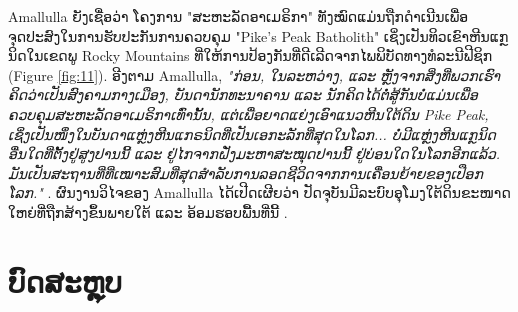 \documentclass[10pt,twocolumn,letterpaper]{article}
\begin{document}
Amallulla ຍັງເຊື່ອວ່າ ໂຄງການ "ສະຫະລັດອາເມຣິກາ" ທັງໝົດແມ່ນຖືກດໍາເນີນເພື່ອຈຸດປະສົງໃນການຮັບປະກັນການຄວບຄຸມ "Pike's Peak Batholith" ເຊິ່ງເປັນທິວເຂົາຫີນແກຼນິດໃນເຂດພູ Rocky Mountains ທີ່ໃຫ້ການປ້ອງກັນທີ່ດີເລີດຈາກໄພພິບັດທາງທໍລະນີຟີຊິກ (Figure \ref{fig:11}). \cite{166}
ອີງຕາມ Amallulla, \textit{"ກ່ອນ, ໃນລະຫວ່າງ, ແລະ ຫຼັງຈາກສິ່ງທີ່ພວກເຮົາຄິດວ່າເປັນສົງຄາມກາງເມືອງ, ບັນດານັກທະນາຄານ ແລະ ນັກຄິດໄດ້ຕໍ່ສູ້ກັນບໍ່ແມ່ນເພື່ອຄວບຄຸມສະຫະລັດອາເມຣິກາເທົ່ານັ້ນ, ແຕ່ເພື່ອຍາດແຍ່ງເອົາແນວຫີນໃຕ້ດິນ Pike Peak, ເຊິ່ງເປັນໜຶ່ງໃນບັນດາແຫຼ່ງຫີນແກຣນິດທີ່ເປັນເອກະລັກທີ່ສຸດໃນໂລກ... ບໍ່ມີແຫຼ່ງຫີນແກຼນິດອື່ນໃດທີ່ຕັ້ງຢູ່ສູງປານນີ້ ແລະ ຢູ່ໄກຈາກຝັ່ງມະຫາສະໝຸດປານນີ້ ຢູ່ບ່ອນໃດໃນໂລກອີກແລ້ວ. ມັນເປັນສະຖານທີ່ທີ່ເໝາະສົມທີ່ສຸດສຳລັບການລອດຊີວິດຈາກການເຄື່ອນຍ້າຍຂອງເປືອກໂລກ."} \cite{33,34}. \cite{167}
ຜົນງານວິໄຈຂອງ Amallulla ໄດ້ເປີດເຜີຍວ່າ ປັດຈຸບັນມີລະບົບອຸໂມງໃຕ້ດິນຂະໜາດໃຫຍ່ທີ່ຖືກສ້າງຂຶ້ນພາຍໃຕ້ ແລະ ອ້ອມຮອບພື້ນທີ່ນີ້ \cite{36}. \cite{168}
\section{ບົດສະຫຼຸບ}
\end{document}
